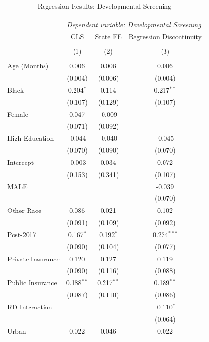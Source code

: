 \documentclass[11pt]{article}
\begin{document}
\begin{table}[!htbp] \centering
  \caption{Regression Results: Developmental Screening}
\begin{tabular}{@{\extracolsep{5pt}}lccc}
\\[-1.8ex]\hline
\hline \\[-1.8ex]
& \multicolumn{3}{c}{\textit{Dependent variable: Developmental Screening}} \
\cr \cline{2-4}
\\[-1.8ex] & \multicolumn{1}{c}{OLS} & \multicolumn{1}{c}{State FE} & \multicolumn{1}{c}{Regression Discontinuity}  \\
\\[-1.8ex] & (1) & (2) & (3) \\
\hline \\[-1.8ex]
 Age (Months) & 0.006$^{}$ & 0.006$^{}$ & 0.006$^{}$ \\
& (0.004) & (0.006) & (0.004) \\
 Black & 0.204$^{*}$ & 0.114$^{}$ & 0.217$^{**}$ \\
& (0.107) & (0.129) & (0.107) \\
 Female & 0.047$^{}$ & -0.009$^{}$ & \\
& (0.071) & (0.092) & \\
 High Education & -0.044$^{}$ & -0.040$^{}$ & -0.045$^{}$ \\
& (0.070) & (0.090) & (0.070) \\
 Intercept & -0.003$^{}$ & 0.034$^{}$ & 0.072$^{}$ \\
& (0.153) & (0.341) & (0.107) \\
 MALE & & & -0.039$^{}$ \\
& & & (0.070) \\
 Other Race & 0.086$^{}$ & 0.021$^{}$ & 0.102$^{}$ \\
& (0.091) & (0.109) & (0.092) \\
 Post-2017 & 0.167$^{*}$ & 0.192$^{*}$ & 0.234$^{***}$ \\
& (0.090) & (0.104) & (0.077) \\
 Private Insurance & 0.120$^{}$ & 0.127$^{}$ & 0.119$^{}$ \\
& (0.090) & (0.116) & (0.088) \\
 Public Insurance & 0.188$^{**}$ & 0.217$^{**}$ & 0.189$^{**}$ \\
& (0.087) & (0.110) & (0.086) \\
 RD Interaction & & & -0.110$^{*}$ \\
& & & (0.064) \\
 Urban & 0.022$^{}$ & 0.046$^{}$ & 0.022$^{}$ \\

\end{tabular}
\end{table}
\end{document}
